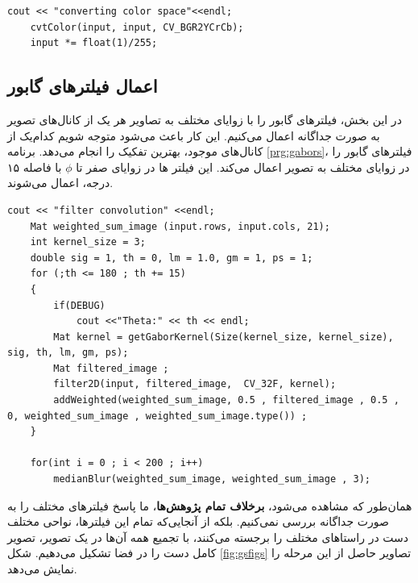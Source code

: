 \documentclass[11.5pt,a4paper]{article}
\begin{document}
 
 \begin{LTR}
    \begin{lstlisting}[style=C++Style,caption=\rl{انتقال فضای رنگی}]
	cout << "converting color space"<<endl;
	cvtColor(input, input, CV_BGR2YCrCb);
	input *= float(1)/255;
    \end{lstlisting}
    \label{prg:cvtcol}
  \end{LTR}

\subsection{اعمال فیلترهای گابور}

در این بخش، فیلترهای گابور را با زوایای مختلف به تصاویر هر یک از کانال‌های تصویر به صورت جداگانه اعمال می‌کنیم. این کار باعث ‌می‌شود متوجه شویم کدام‌یک از کانال‌های موجود، بهترین تفکیک را انجام می‌دهد.
برنامه \ref{prg:gabors}، فیلترهای گابور را در زوایای مختلف به تصویر اعمال می‌کند. این فیلتر ها در زوایای صفر تا $\phi$ با فاصله ۱۵ درجه، اعمال می‌شوند.
  
 \begin{LTR}
    \begin{lstlisting}[style=C++Style,caption=\rl{اعمال فیلترهای گابور در زوایای مختلف به تصویر پیش‌پردازش شده}]
	cout << "filter convolution" <<endl;
	Mat weighted_sum_image (input.rows, input.cols, 21);
	int kernel_size = 3;
	double sig = 1, th = 0, lm = 1.0, gm = 1, ps = 1;
	for (;th <= 180 ; th += 15)
	{
		if(DEBUG)
			cout <<"Theta:" << th << endl;
		Mat kernel = getGaborKernel(Size(kernel_size, kernel_size), sig, th, lm, gm, ps);
		Mat filtered_image ;
		filter2D(input, filtered_image,  CV_32F, kernel);
		addWeighted(weighted_sum_image, 0.5 , filtered_image , 0.5 , 0, weighted_sum_image , weighted_sum_image.type()) ;
	}

	for(int i = 0 ; i < 200 ; i++)
		medianBlur(weighted_sum_image, weighted_sum_image , 3);
	    \end{lstlisting}
    \label{prg:gabors}
  \end{LTR}

همان‌‌طور که مشاهده می‌شود، \textbf{برخلاف تمام پژوهش‌ها}، ما پاسخ فیلترهای مختلف را به صورت جداگانه بررسی نمی‌کنیم. بلکه از آنجایی‌که تمام این فیلترها، نواحی مختلف دست در راستاهای مختلف را برجسته می‌کنند، با تجمیع همه آن‌ها در یک تصویر، تصویر کامل دست را در فضا تشکیل می‌دهیم. شکل \ref{fig:gsfigs} تصاویر حاصل از این مرحله را نمایش می‌دهد.
\end{document}
